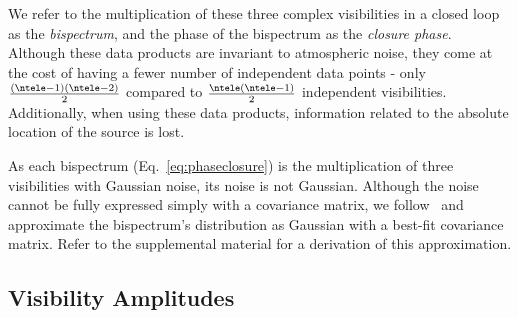 We refer to the multiplication of these three complex visibilities in a closed loop 
as the {\it bispectrum}, and the phase of the bispectrum %
as the {\it closure phase}.
Although these data products are invariant to atmospheric noise, they come at the cost of having a fewer number of independent data points - only $\frac{(\ntele-1)(\ntele-2)}{2}$ compared to  $\frac{\ntele(\ntele-1)}{2}$ independent visibilities. Additionally, when using these data products, information related to the absolute location of the source is lost. 

As each bispectrum (Eq.~\ref{eq:phaseclosure}) is the multiplication of three visibilities with Gaussian noise, its noise is not Gaussian. 
Although the noise cannot be fully expressed simply with a covariance matrix, we follow~\cite{bouman2016computational} and approximate the bispectrum's distribution as Gaussian with a best-fit covariance matrix.
Refer to the supplemental material for a derivation of this approximation. 




 
 
\subsection{Visibility Amplitudes }
\label{sec:visamp}



